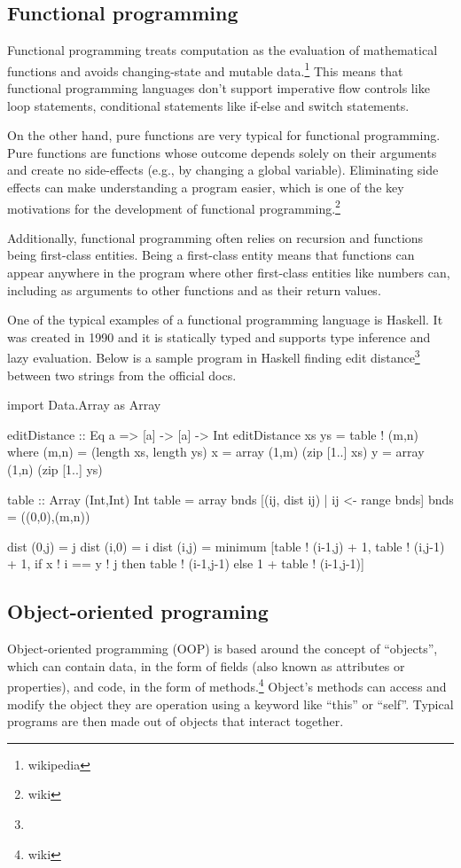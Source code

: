 \subsection{Functional programming}
Functional programming treats computation as the evaluation of mathematical functions and avoids changing-state and mutable data.\footnote{wikipedia}
This means that functional programming languages don’t support imperative flow controls like loop statements, conditional statements like if-else and
switch statements.

On the other hand, pure functions are very typical for functional programming. Pure functions are functions whose outcome depends solely on their arguments
and create no side-effects (e.g., by changing a global variable). Eliminating side effects can make understanding a program easier, which is one of the
key motivations for the development of functional programming.\footnote{wiki}

Additionally, functional programming often relies on recursion and functions being first-class entities. Being a first-class entity means that functions can appear
anywhere in the program where other first-class entities like numbers can, including as arguments to other functions and as their return values.

One of the typical examples of a functional programming language is Haskell. It was created in 1990 and it is statically typed and supports type inference
and lazy evaluation. Below is a sample program in Haskell finding edit distance\footnote{} between two strings from the official docs.
\begin{code}
import Data.Array as Array

editDistance :: Eq a => [a] -> [a] -> Int
editDistance xs ys = table ! (m,n)
    where
    (m,n) = (length xs, length ys)
    x     = array (1,m) (zip [1..] xs)
    y     = array (1,n) (zip [1..] ys)
    
    table :: Array (Int,Int) Int
    table = array bnds [(ij, dist ij) | ij <- range bnds]
    bnds  = ((0,0),(m,n))
    
    dist (0,j) = j
    dist (i,0) = i
    dist (i,j) = minimum [table ! (i-1,j) + 1, table ! (i,j-1) + 1,
        if x ! i == y ! j
            then table ! (i-1,j-1)
            else 1 + table ! (i-1,j-1)]
\end{code}

\subsection{Object-oriented programing}
Object-oriented programming (OOP) is based around the concept of ``objects'', which can contain data, in the form of fields (also known as attributes or properties),
and code, in the form of methods.\footnote{wiki} Object's methods can access and modify the object they are operation using a keyword like ``this'' or ``self''.
Typical programs are then made out of objects that interact together.

